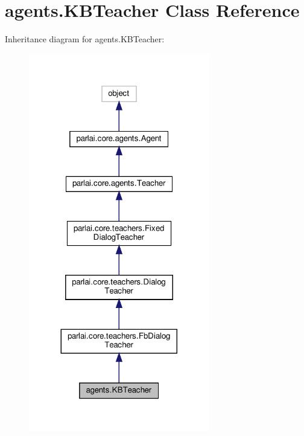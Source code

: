 \hypertarget{classagents_1_1KBTeacher}{}\section{agents.\+K\+B\+Teacher Class Reference}
\label{classagents_1_1KBTeacher}


Inheritance diagram for agents.\+K\+B\+Teacher\+:
\nopagebreak
\begin{figure}[H]
\begin{center}
\leavevmode
\includegraphics[width=224pt]{classagents_1_1KBTeacher__inherit__graph}
\end{center}
\end{figure}


